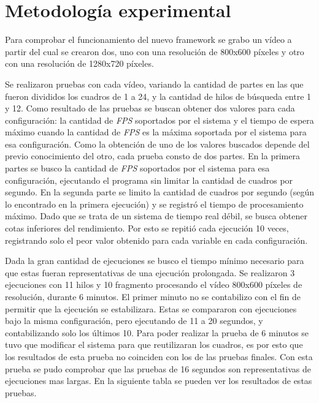 
\section{Metodología experimental}

Para comprobar el funcionamiento del nuevo framework se grabo un vídeo a partir
del cual se crearon dos, uno con una resolución de 800x600 píxeles y otro con
una resolución de 1280x720 píxeles.

Se realizaron pruebas con cada vídeo, variando la cantidad de partes en las que
fueron divididos los cuadros de 1 a 24, y la cantidad de hilos de búsqueda entre
1 y 12. Como resultado de las pruebas se buscan obtener dos valores para cada
configuración: la cantidad de \emph{FPS} soportados por el sistema y el tiempo
de espera máximo cuando la cantidad de \emph{FPS} es la máxima soportada por el
sistema para esa configuración. Como la obtención de uno de los valores buscados
depende del previo conocimiento del otro, cada prueba consto de dos partes.  En
la primera partes se busco la cantidad de \emph{FPS} soportados por el sistema
para esa configuración, ejecutando el programa sin limitar la cantidad de
cuadros por segundo. En la segunda parte se limito la cantidad de cuadros por
segundo (según lo encontrado en la primera ejecución) y se registró el tiempo de
procesamiento máximo. Dado que se trata de un sistema de tiempo real débil, se
busca obtener cotas inferiores del rendimiento. Por esto se repitió cada
ejecución 10 veces, registrando solo el peor valor obtenido para cada variable
en cada configuración.

Dada la gran cantidad de ejecuciones se busco el tiempo mínimo necesario para
que estas fueran representativas de una ejecución prolongada. Se realizaron 3
ejecuciones con 11 hilos y 10 fragmento procesando el vídeo 800x600 píxeles de
resolución, durante 6 minutos. El primer minuto no se contabilizo con el fin de
permitir que la ejecución se estabilizara. Estas se compararon con ejecuciones
bajo la misma configuración, pero ejecutando de 11 a 20 segundos, y
contabilizando solo los últimos 10. Para poder realizar la prueba de 6 minutos
se tuvo que modificar el sistema para que reutilizaran los cuadros, es por esto
que los resultados de esta prueba no coinciden con los de las pruebas finales.
Con esta prueba se pudo comprobar que las pruebas de 16 segundos son
representativas de ejecuciones mas largas. En la siguiente tabla se pueden ver
los resultados de estas pruebas.

